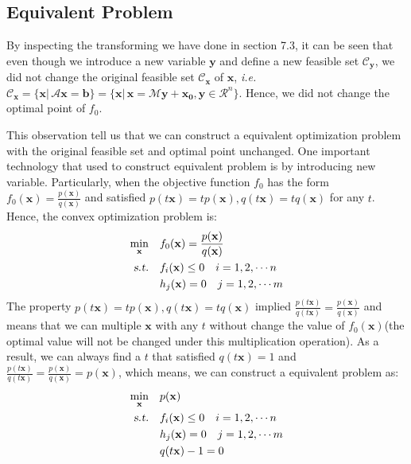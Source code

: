 \documentclass[10pt,a4paper]{article}
\begin{document}
\subsection{Equivalent Problem}
By inspecting the transforming we have done in section 7.3, it can be seen that even though we introduce a new variable $\mathbf{y}$ and define a new feasible set $\mathcal{C}_{\mathbf{y}}$, we did not change the original feasible set $\mathcal{C}_{\mathbf{x}}$ of $\mathbf{x}$, \textsl{i.e.} $\mathcal{C}_{\mathbf{x}} = \{ \mathbf{x} |\, \mathcal{A} \mathbf{x} = \mathbf{b} \} =  \{ \mathbf{x} |\, \mathbf{x} = \mathcal{M} \mathbf{y} + \mathbf{x_{0}}, \mathbf{y} \in \mathcal{R}^{n} \}$. Hence, we did not change the optimal point of $f_{0}$. 

This observation tell us that we can construct a equivalent optimization problem with the original feasible set and optimal point unchanged. One important technology that used to construct equivalent problem is by introducing new variable. Particularly, when the objective function $f_{0}$ has the form $f_{0}(\mathbf{x}) = \frac{p(\mathbf{x})}{q(\mathbf{x})}$ and satisfied $p(t \mathbf{x}) = t p(\mathbf{x}), q(t \mathbf{x}) = t q(\mathbf{x})$ for any $t$. Hence, the convex optimization problem is:
\begin{equation*}
	\begin{aligned}
		\displaystyle \min_{\mathbf{x}} \quad & f_{0}(\mathbf{x}) = \frac{p(\mathbf{x})}{q(\mathbf{x})} \\
		\textsl{s.t.} \quad & f_{i}(\mathbf{x}) \leq 0 \quad i = 1, 2, \cdots n \\
		& h_{j}(\mathbf{x}) = 0 \quad j = 1, 2, \cdots m
	\end{aligned}
\end{equation*}
The property $p(t \mathbf{x}) = t p(\mathbf{x}), q(t \mathbf{x}) = t q(\mathbf{x})$ implied $\frac{p(t \mathbf{x})}{q(t \mathbf{x})} = \frac{p(\mathbf{x})}{q(\mathbf{x})}$ and  means that we can multiple $\mathbf{x}$ with any $t$ without change the value of $f_{0}(\mathbf{x})$(the optimal value will not be changed under this multiplication operation). As a result, we can always find a $t$ that satisfied $q(t \mathbf{x}) = 1$ and $\frac{p(t \mathbf{x})}{q(t \mathbf{x})} = \frac{p(\mathbf{x})}{q(\mathbf{x})} = p(\mathbf{x})$, which means, we can construct a equivalent problem as:
\begin{equation}
	\begin{aligned}
		\displaystyle\min_{\mathbf{x}} \quad & p(\mathbf{x}) \\
		\textsl{s.t.} \quad & f_{i}(\mathbf{x}) \leq 0 \quad i = 1, 2, \cdots n \\
		& h_{j}(\mathbf{x}) = 0 \quad j = 1, 2, \cdots m \\
		& q(t \mathbf{x}) - 1 = 0
	\end{aligned}
\end{equation}
\end{document}
